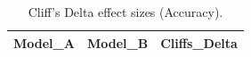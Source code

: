 \begin{table}[t]
\centering
\begin{tabular}{lll}
\toprule
Model_A & Model_B & Cliffs_Delta \\
\midrule
\bottomrule
\end{tabular}
\caption{Cliff's Delta effect sizes (Accuracy).}
\label{tab:cliffs_Accuracy}
\end{table}